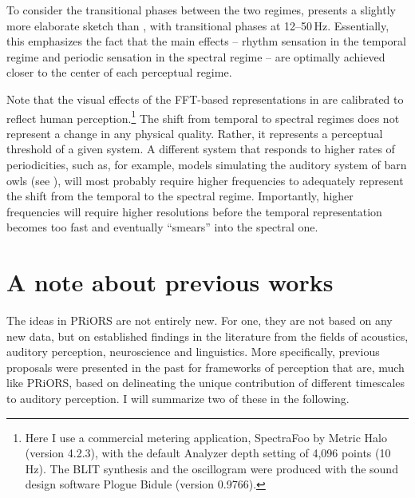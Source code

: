 To consider the transitional phases between the two regimes,  pres\-ents a slightly more elaborate sketch than , with transitional phases at 12--50\,Hz. Essentially, this emphasizes the fact that the main effects -- rhythm sensation in the temporal regime and periodic sensation in the spectral regime -- are optimally achieved closer to the center of each perceptual regime.

Note that the visual effects of the FFT-based representations in  are calibrated to reflect human perception.\footnote{Here I use a commercial metering application, SpectraFoo by Metric Halo (version 4.2.3), with the default Analyzer depth setting of 4,096 points (10\,Hz). The BLIT synthesis and the oscillogram were produced with the sound design software Plogue Bidule (version 0.9766).} The shift from temporal to spectral regimes does not represent a change in any physical quality. Rather, it represents a perceptual threshold of a given system.
A different system that responds to higher rates of periodicities, such as, for example, models simulating the auditory system of barn owls (see \citealt{koppl1997phasesk}), will most probably require higher frequencies to adequately represent the shift from the temporal to the spectral regime. Importantly, higher frequencies will require higher resolutions before the temporal representation becomes too fast and eventually \enquote{smears} into the spectral one.

\section{A note about previous works}\label{a-note-about-previous-works-warren-and-rosen}

The ideas in PRiORS are not entirely new. For one, they are not based on any new data, but on established findings in the literature from the fields of acoustics, auditory perception, neuroscience and linguistics. More specifically, previous proposals were presented in the past for frameworks of perception that are, much like PRiORS, based on delineating the unique contribution of different timescales to auditory perception.
I will summarize two of these in the following.

